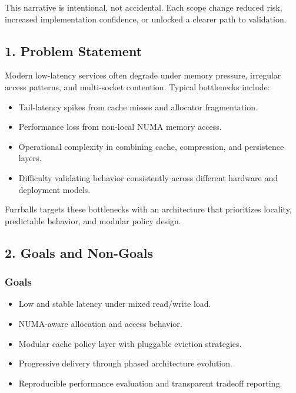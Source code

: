 \documentclass[
  english,
  letterpaper,
  DIV=11,
  numbers=noendperiod]{scrartcl}
\providecommand{\tightlist}{%
  \setlength{\itemsep}{0pt}\setlength{\parskip}{0pt}}
\begin{document}
This narrative is intentional, not accidental. Each scope change reduced
risk, increased implementation confidence, or unlocked a clearer path to
validation.

\subsection{1. Problem Statement}\label{problem-statement}

Modern low-latency services often degrade under memory pressure,
irregular access patterns, and multi-socket contention. Typical
bottlenecks include:

\begin{itemize}
\tightlist
\item
  Tail-latency spikes from cache misses and allocator fragmentation.
\item
  Performance loss from non-local NUMA memory access.
\item
  Operational complexity in combining cache, compression, and
  persistence layers.
\item
  Difficulty validating behavior consistently across different hardware
  and deployment models.
\end{itemize}

Furrballs targets these bottlenecks with an architecture that
prioritizes locality, predictable behavior, and modular policy design.

\subsection{2. Goals and Non-Goals}\label{goals-and-non-goals}

\subsubsection{Goals}\label{goals}

\begin{itemize}
\tightlist
\item
  Low and stable latency under mixed read/write load.
\item
  NUMA-aware allocation and access behavior.
\item
  Modular cache policy layer with pluggable eviction strategies.
\item
  Progressive delivery through phased architecture evolution.
\item
  Reproducible performance evaluation and transparent tradeoff
  reporting.
\end{itemize}
\end{document}
